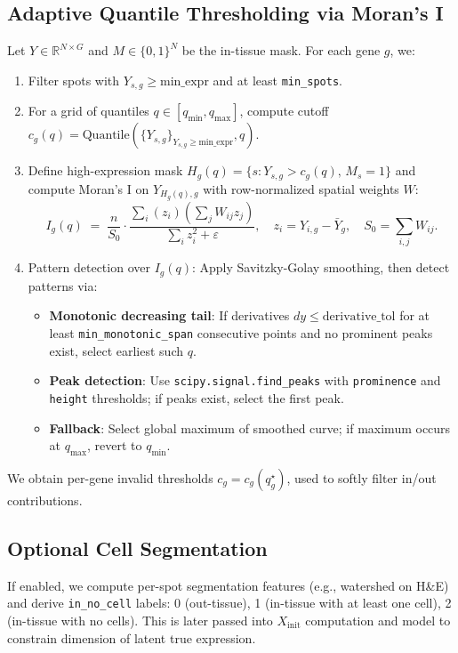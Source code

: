 \documentclass[11pt]{article}
\begin{document}
\subsection{Adaptive Quantile Thresholding via Moran's I}
Let $Y\in\mathbb{R}^{N\times G}$ and $M\in\{0,1\}^N$ be the in-tissue mask. For each gene $g$, we:
\begin{enumerate}
  \item Filter spots with $Y_{s,g}\ge \text{min\_expr}$ and at least \texttt{min\_spots}.
  \item For a grid of quantiles $q\in [q_{\min}, q_{\max}]$, compute cutoff $c_g(q)=\text{Quantile}( \{Y_{s,g}\}_{Y_{s,g}\ge \text{min\_expr}}, q)$.
  \item Define high-expression mask $H_g(q)=\{s: Y_{s,g} > c_g(q),\, M_s=1\}$ and compute Moran's I on $Y_{H_g(q),g}$ with row-normalized spatial weights $W$:
  \[
    I_g(q) \;=\; \frac{n}{S_0}\cdot \frac{\sum_{i}(z_i)(\sum_j W_{ij} z_j)}{\sum_i z_i^2 + \varepsilon}, \quad z_i = Y_{i,g} - \bar{Y}_g, \quad S_0=\sum_{i,j} W_{ij}.
  \]
  \item Pattern detection over $I_g(q)$: Apply Savitzky-Golay smoothing, then detect patterns via:
  \begin{itemize}
    \item \textbf{Monotonic decreasing tail}: If derivatives $dy \le \text{derivative\_tol}$ for at least \texttt{min\_monotonic\_span} consecutive points and no prominent peaks exist, select earliest such $q$.
    \item \textbf{Peak detection}: Use \texttt{scipy.signal.find\_peaks} with \texttt{prominence} and \texttt{height} thresholds; if peaks exist, select the first peak.
    \item \textbf{Fallback}: Select global maximum of smoothed curve; if maximum occurs at $q_{\max}$, revert to $q_{\min}$.
  \end{itemize}
\end{enumerate}
We obtain per-gene invalid thresholds $c_g = c_g(q^\star_g)$, used to softly filter in/out contributions.


\subsection{Optional Cell Segmentation}
If enabled, we compute per-spot segmentation features (e.g., watershed on H\&E) and derive \texttt{in\_no\_cell} labels: 0 (out-tissue), 1 (in-tissue with at least one cell), 2 (in-tissue with no cells). This is later passed into $X_{\text{init}}$ computation and model to constrain dimension of latent true expression.
\end{document}

